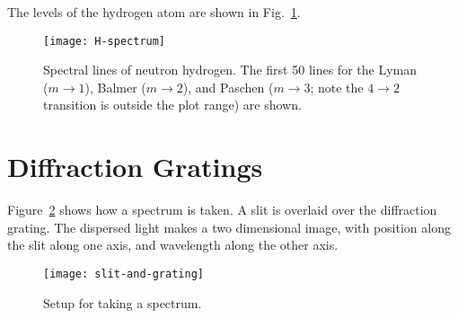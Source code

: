 
The levels of the hydrogen atom are shown in Fig.~\ref{f.H-spectrum}.

\begin{figure}[htbp]
\texttt{[image: H-spectrum]}
\caption{Spectral lines of neutron hydrogen. The first 50 lines for the Lyman ($m\to1$), Balmer ($m\to2$), and Paschen ($m\to3$; note the $4\to2$ transition is outside the plot range) are shown.
\label{f.H-spectrum}}
\end{figure}

\section{Diffraction Gratings}

Figure~\ref{f.slit-and-grating} shows how a spectrum is taken.  A slit is overlaid over the diffraction grating. The dispersed light makes a two dimensional image, with position along the slit along one axis, and wavelength along the other axis.

\begin{figure}[htbp]
\texttt{[image: slit-and-grating]}
\caption{Setup for taking a spectrum.
\label{f.slit-and-grating}}
\end{figure} 
